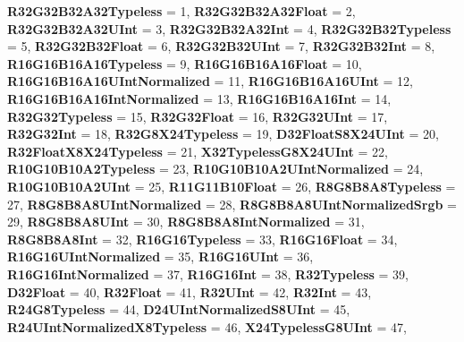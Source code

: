 \begin{DoxyCompactItemize}
{\bfseries R32\+G32\+B32\+A32\+Typeless} = 1, 
{\bfseries R32\+G32\+B32\+A32\+Float} = 2, 
{\bfseries R32\+G32\+B32\+A32\+U\+Int} = 3, 
\newline
{\bfseries R32\+G32\+B32\+A32\+Int} = 4, 
{\bfseries R32\+G32\+B32\+Typeless} = 5, 
{\bfseries R32\+G32\+B32\+Float} = 6, 
{\bfseries R32\+G32\+B32\+U\+Int} = 7, 
\newline
{\bfseries R32\+G32\+B32\+Int} = 8, 
{\bfseries R16\+G16\+B16\+A16\+Typeless} = 9, 
{\bfseries R16\+G16\+B16\+A16\+Float} = 10, 
{\bfseries R16\+G16\+B16\+A16\+U\+Int\+Normalized} = 11, 
\newline
{\bfseries R16\+G16\+B16\+A16\+U\+Int} = 12, 
{\bfseries R16\+G16\+B16\+A16\+Int\+Normalized} = 13, 
{\bfseries R16\+G16\+B16\+A16\+Int} = 14, 
{\bfseries R32\+G32\+Typeless} = 15, 
\newline
{\bfseries R32\+G32\+Float} = 16, 
{\bfseries R32\+G32\+U\+Int} = 17, 
{\bfseries R32\+G32\+Int} = 18, 
{\bfseries R32\+G8\+X24\+Typeless} = 19, 
\newline
{\bfseries D32\+Float\+S8\+X24\+U\+Int} = 20, 
{\bfseries R32\+Float\+X8\+X24\+Typeless} = 21, 
{\bfseries X32\+Typeless\+G8\+X24\+U\+Int} = 22, 
{\bfseries R10\+G10\+B10\+A2\+Typeless} = 23, 
\newline
{\bfseries R10\+G10\+B10\+A2\+U\+Int\+Normalized} = 24, 
{\bfseries R10\+G10\+B10\+A2\+U\+Int} = 25, 
{\bfseries R11\+G11\+B10\+Float} = 26, 
{\bfseries R8\+G8\+B8\+A8\+Typeless} = 27, 
\newline
{\bfseries R8\+G8\+B8\+A8\+U\+Int\+Normalized} = 28, 
{\bfseries R8\+G8\+B8\+A8\+U\+Int\+Normalized\+Srgb} = 29, 
{\bfseries R8\+G8\+B8\+A8\+U\+Int} = 30, 
{\bfseries R8\+G8\+B8\+A8\+Int\+Normalized} = 31, 
\newline
{\bfseries R8\+G8\+B8\+A8\+Int} = 32, 
{\bfseries R16\+G16\+Typeless} = 33, 
{\bfseries R16\+G16\+Float} = 34, 
{\bfseries R16\+G16\+U\+Int\+Normalized} = 35, 
\newline
{\bfseries R16\+G16\+U\+Int} = 36, 
{\bfseries R16\+G16\+Int\+Normalized} = 37, 
{\bfseries R16\+G16\+Int} = 38, 
{\bfseries R32\+Typeless} = 39, 
\newline
{\bfseries D32\+Float} = 40, 
{\bfseries R32\+Float} = 41, 
{\bfseries R32\+U\+Int} = 42, 
{\bfseries R32\+Int} = 43, 
\newline
{\bfseries R24\+G8\+Typeless} = 44, 
{\bfseries D24\+U\+Int\+Normalized\+S8\+U\+Int} = 45, 
{\bfseries R24\+U\+Int\+Normalized\+X8\+Typeless} = 46, 
{\bfseries X24\+Typeless\+G8\+U\+Int} = 47, 
\newline

\end{DoxyCompactItemize}
